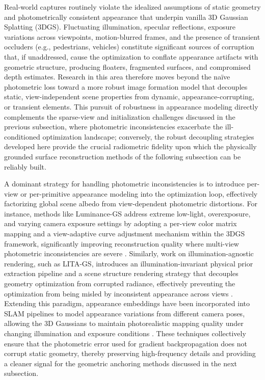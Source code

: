 \documentclass[11pt,a4paper]{article}
\begin{document}
Real-world captures routinely violate the idealized assumptions of static geometry and photometrically consistent appearance that underpin vanilla 3D Gaussian Splatting (3DGS). Fluctuating illumination, specular reflections, exposure variations across viewpoints, motion-blurred frames, and the presence of transient occluders (e.g., pedestrians, vehicles) constitute significant sources of corruption that, if unaddressed, cause the optimization to conflate appearance artifacts with geometric structure, producing floaters, fragmented surfaces, and compromised depth estimates. Research in this area therefore moves beyond the na\"{i}ve photometric loss toward a more robust image formation model that decouples static, view-independent scene properties from dynamic, appearance-corrupting, or transient elements. This pursuit of robustness in appearance modeling directly complements the sparse-view and initialization challenges discussed in the previous subsection, where photometric inconsistencies exacerbate the ill-conditioned optimization landscape; conversely, the robust decoupling strategies developed here provide the crucial radiometric fidelity upon which the physically grounded surface reconstruction methods of the following subsection can be reliably built.

A dominant strategy for handling photometric inconsistencies is to introduce per-view or per-primitive appearance modeling into the optimization loop, effectively factorizing global scene albedo from view-dependent photometric distortions. For instance, methods like Luminance-GS address extreme low-light, overexposure, and varying camera exposure settings by adopting a per-view color matrix mapping and a view-adaptive curve adjustment mechanism within the 3DGS framework, significantly improving reconstruction quality where multi-view photometric inconsistencies are severe \cite{arxiv:2504.01503v2}. Similarly, work on illumination-agnostic rendering, such as LITA-GS, introduces an illumination-invariant physical prior extraction pipeline and a scene structure rendering strategy that decouples geometry optimization from corrupted radiance, effectively preventing the optimization from being misled by inconsistent appearance across views \cite{arxiv:2504.00219v1}. Extending this paradigm, appearance embeddings have been incorporated into SLAM pipelines to model appearance variations from different camera poses, allowing the 3D Gaussians to maintain photorealistic mapping quality under changing illumination and exposure conditions \cite{arxiv:2501.05242v3}. These techniques collectively ensure that the photometric error used for gradient backpropagation does not corrupt static geometry, thereby preserving high-frequency details and providing a cleaner signal for the geometric anchoring methods discussed in the next subsection.
\end{document}
